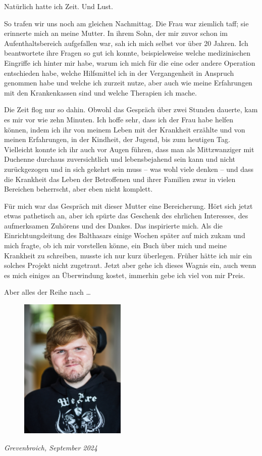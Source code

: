 \documentclass[fontsize=14pt,a4paper,headinclude,DIV=calc,automark]{scrbook}
\begin{document}
Natürlich hatte ich Zeit. Und Lust.

So trafen wir uns noch am gleichen Nachmittag. Die Frau war ziemlich taff; sie erinnerte mich an meine Mutter. In ihrem Sohn, der mir zuvor schon im Aufenthaltsbereich aufgefallen war, sah ich mich selbst vor über 20 Jahren. Ich beantwortete ihre Fragen so gut ich konnte, beispielsweise welche medizinischen Eingriffe ich hinter mir habe, warum ich mich für die eine oder andere Operation entschieden habe, welche Hilfsmittel ich in der Vergangenheit in Anspruch genommen habe und welche ich zurzeit nutze, aber auch wie meine Erfahrungen mit den Krankenkassen sind und welche Therapien ich mache.

Die Zeit flog nur so dahin. Obwohl das Gespräch über zwei Stunden dauerte, kam es mir vor wie zehn Minuten. Ich hoffe sehr, dass ich der Frau habe helfen können, indem ich ihr von meinem Leben mit der Krankheit erzählte und von meinen Erfahrungen, in der Kindheit, der Jugend, bis zum heutigen Tag. Vielleicht konnte ich ihr auch vor Augen führen, dass man als Mittzwanziger mit Duchenne durchaus zuversichtlich und lebensbejahend sein kann und nicht zurückgezogen und in sich gekehrt sein muss – was wohl viele denken – und dass die Krankheit das Leben der Betroffenen und ihrer Familien zwar in vielen Bereichen beherrscht, aber eben nicht komplett.

Für mich war das Gespräch mit dieser Mutter eine Bereicherung. Hört sich jetzt etwas pathetisch an, aber ich spürte das Geschenk des ehrlichen Interesses, des aufmerksamen Zuhörens und des Dankes. Das inspirierte mich. Als die Einrichtungsleitung des Balthasars einige Wochen später auf mich zukam und mich fragte, ob ich mir vorstellen könne, ein Buch über mich und meine Krankheit zu schreiben, musste ich nur kurz überlegen. Früher hätte ich mir ein solches Projekt nicht zugetraut. Jetzt aber gehe ich dieses Wagnis ein, auch wenn es mich einiges an Überwindung kostet, immerhin gebe ich viel von mir Preis.

\noindent Aber alles der Reihe nach …

\begin{figure}[H]
    \raggedright
    \includegraphics[width=0.45\textwidth]{Fotos/Marius_skaliert.jpg}
\end{figure}
\noindent\small\textit{Grevenbroich, September 2024}
\end{document}
